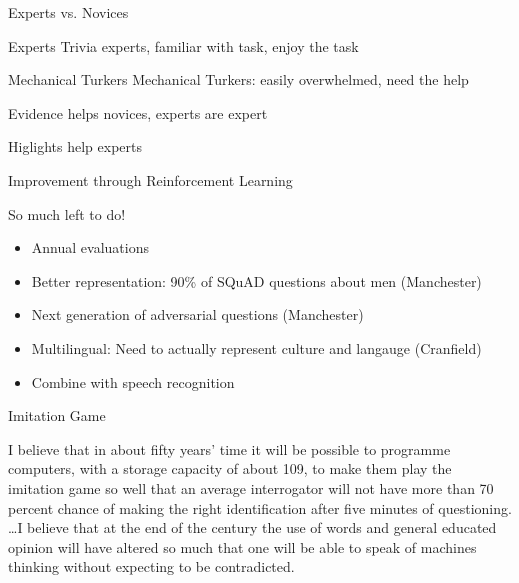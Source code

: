 \documentclass[xcolor=dvipsnames,xcolor=table]{beamer}
\newcommand{\fsi}[2]{
\begin{frame}[plain]
\vspace*{-1pt}
\makebox[\linewidth]{\texttt{[image: \#1]}}
\begin{center}
#2
\end{center}
\end{frame}
}
\newcommand{\gfxq}[2]{
\begin{center}
	\texttt{[image: qb/\#1]}
\end{center}
}
\begin{document}
\fsi{qb/augment/screenshot_evidence}{}

\begin{frame}{Experts vs. Novices}

 \begin{block}{Experts}
   Trivia experts, familiar with task, enjoy the task
 \end{block}

 \begin{block}{Mechanical Turkers}
   Mechanical Turkers: easily overwhelmed, need the help
 \end{block}

\end{frame}

\fsi{qb/augment/tools_acc}{Evidence helps novices, experts are expert}
\fsi{qb/augment/tools_buzz}{Higlights help experts}


\begin{frame}{Improvement through Reinforcement Learning}

  \only<1>{\gfxq{rl_centaur_2}{.9}}
  \only<2>{\gfxq{rl_centaur_3}{.9}}
  \only<3>{\gfxq{rl_centaur_4}{.9}}
  \only<4>{\gfxq{rl_centaur_5}{.9}}
  \only<5>{\gfxq{rl_centaur_6}{.9}}

\end{frame}



\begin{frame}{So much left to do!}

  \begin{itemize}
  \item Annual evaluations
  \item Better representation: 90\% of SQuAD questions about men (Manchester)
  \item Next generation of adversarial questions (Manchester)
  \item Multilingual: Need to actually represent culture and langauge (Cranfield)
  \item Combine with speech recognition 
  \end{itemize}
  
\end{frame}

\begin{frame}{Imitation Game}

  I believe that in about fifty years’ time it will be possible to programme computers, with a storage capacity of about 109, to make them play the imitation game so well that an average interrogator will not have more than 70 percent chance of making the right identification after five minutes of questioning. \dots I believe that at the \alert<2>{end of the century} the use of words and general educated opinion will have altered so much that \alert<2>{one will be able to speak of machines thinking without expecting to be contradicted}.

\end{frame}
\end{document}
